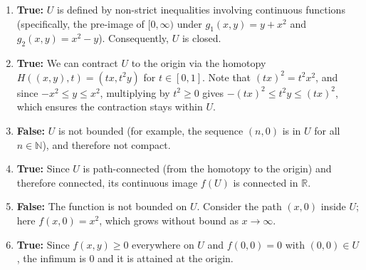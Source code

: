 \begin{exercisesolution}
\label{sol:topology_continuous_images_tf}
\begin{enumerate}[label=\textbf{(\alph*)}]
  \item \textbf{True:} $U$ is defined by non-strict inequalities involving continuous functions (specifically, the pre-image of $[0, \infty)$ under $g_1(x,y) = y+x^2$ and $g_2(x,y) = x^2-y$). Consequently, $U$ is closed.
  \item \textbf{True:} We can contract $U$ to the origin via the homotopy $H((x,y), t) = (tx, t^2y)$ for $t \in [0,1]$. Note that $(tx)^2 = t^2x^2$, and since $-x^2 \le y \le x^2$, multiplying by $t^2 \ge 0$ gives $-(tx)^2 \le t^2y \le (tx)^2$, which ensures the contraction stays within $U$.
  \item \textbf{False:} $U$ is not bounded (for example, the sequence $(n,0)$ is in $U$ for all $n \in \mathbb{N}$), and therefore not compact.
  \item \textbf{True:} Since $U$ is path-connected (from the homotopy to the origin) and therefore connected, its continuous image $f(U)$ is connected in $\mathbb{R}$.
  \item \textbf{False:} The function is not bounded on $U$. Consider the path $(x,0)$ inside $U$; here $f(x,0) = x^2$, which grows without bound as $x \to \infty$.
  \item \textbf{True:} Since $f(x,y) \ge 0$ everywhere on $U$ and $f(0,0) = 0$ with $(0,0) \in U$, the infimum is $0$ and it is attained at the origin.
\end{enumerate}
\end{exercisesolution}

